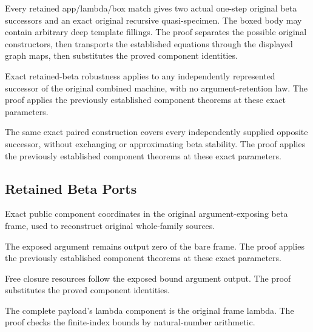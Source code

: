 Every retained app/lambda/box match gives two actual one-step original
beta successors and an exact original recursive quasi-specimen. The boxed
body may contain arbitrary deep template fillings.
The proof separates the possible original constructors, then transports the established equations through the displayed graph maps, then substitutes the proved component identities.
\par{}

Exact retained-beta robustness applies to any independently represented
successor of the original combined machine, with no argument-retention law.
The proof applies the previously established component theorems at these exact parameters.
\par{}

The same exact paired construction covers every independently supplied
opposite successor, without exchanging or approximating beta stability.
The proof applies the previously established component theorems at these exact parameters.
\par{}

\subsection{Retained Beta Ports}
Exact public component coordinates in the original argument-exposing
beta frame, used to reconstruct original whole-family sources.

The exposed argument remains output zero of the bare frame.
The proof applies the previously established component theorems at these exact parameters.
\par{}

Free closure resources follow the exposed bound argument output.
The proof substitutes the proved component identities.
\par{}

The complete payload's lambda component is the original frame lambda.
The proof checks the finite-index bounds by natural-number arithmetic.
\par{}

